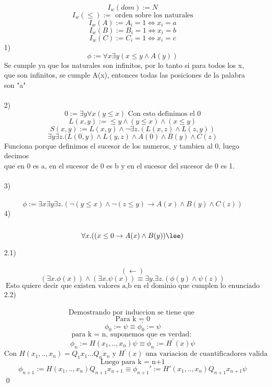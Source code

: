 \documentclass[letter]{article}
\begin{document}
    
    \begin{pregunta}{1} %
            $$ I_{w}(dom) := N $$
            $$ I_{w}(\leq) := \text{ orden sobre los naturales} $$
            $$ I_{w}(A) := A_{i} = 1 \Leftrightarrow x_{i} = a $$
            $$ I_{w}(B) := B_{i} = 1 \Leftrightarrow x_{i} = b $$
            $$ I_{w}(C) := C_{i} = 1 \Leftrightarrow x_{i} = c $$
            1)\\
            $$ \phi := \forall x \exists y (x \leq y \wedge A(y))$$
            Se cumple ya que los naturales son infinitos, por lo tanto si para todos los x,\\
            que son infinitos, se cumple A(x), entonces todas las posiciones de la palabra\\
            son "a"\\\\
            2)\\
            $$ 0 := \exists y \forall x (y \leq x ) \text{ Con esto definimos el 0}$$
            $$ L(x,y) := \leq y \wedge (y \leq x) \wedge (x \leq y) $$
            $$ S(x,y) := L(x,y) \wedge \neg \exists z. (L(x,z) \wedge L(z,y)) $$
            $$ \exists y \exists z. (L(0,y) \wedge L(y,z) \wedge A(0) \wedge B(y) \wedge C(z) $$
            Funciona porque definimos el sucesor de los numeros, y tambien al 0, luego decimos\\
            que en 0 es a, en el sucesor de 0 es b y en el sucesor del sucesor de 0 es 1.
            \\\\
            3)\\\\
            $$ \phi := \exists x \exists y \exists z. (\neg (y \leq x) \wedge \neg (z \leq y) \rightarrow A(x) \wedge B(y) \wedge C(z) )  $$
            4)\\\\
            $$ \forall x. (( x \leq 0 \rightarrow A(x) \wedge B(y) )\lee ) $$
    \end{pregunta}
    
    \begin{pregunta}{2}
        2.1)\\\\
        $$(\leftarrow)$$
        $$ (\exists x. \phi(x)) \wedge (\exists x. \psi(x)) \equiv \exists y.\exists z.(\phi(y) ∧ \psi(z))$$
        $$ \text{Esto quiere decir que existen valores a,b en el dominio que cumplen lo enunciado} $$
        $$ $$
        2.2)\\\\
        $$ \text{Demostrando por induccion se tiene que } $$
        $$ \text{Para k = 0} $$
        $$ \phi_{0} := \psi \equiv \phi^{'}_{0} := \psi $$
        $$ \text{para k = n, suponemos que es verdad: } $$
        $$ \phi_{n} := H(x_{1},..,x_{n})\psi \equiv \phi_{n}^{'} := H^{'}(x)\psi $$
        $$ \text{Con } H(x_{1},..,x_{n}) = Q_{1}x_{1}...Q_{n}x_{n} \text{ y } H^{'}(x) \text{ una variacion de cuantificadores valida}$$
        $$ \text{Luego para k = n+1}$$
        $$ \phi_{n+1} := H(x_{1},..,x_{n})Q_{n+1}x_{n+1} \equiv \phi_{n+1}' := H'(x_{1},..,x_{n})Q_{n+1}x_{n+1}\psi $$
        \qed
    \end{pregunta}
\end{document}
